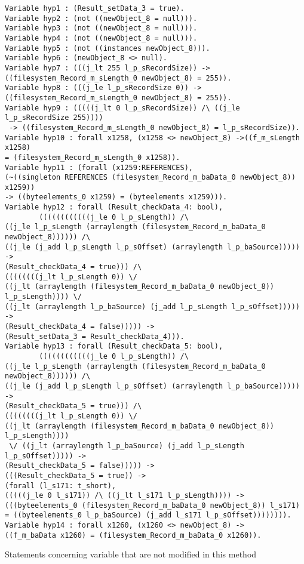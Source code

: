 \begin{lstlisting}
Variable hyp1 : (Result_setData_3 = true).
Variable hyp2 : (not ((newObject_8 = null))).
Variable hyp3 : (not ((newObject_8 = null))).
Variable hyp4 : (not ((newObject_8 = null))).
Variable hyp5 : (not ((instances newObject_8))).
Variable hyp6 : (newObject_8 <> null).
Variable hyp7 : (((j_lt 255 l_p_sRecordSize)) ->
((filesystem_Record_m_sLength_0 newObject_8) = 255)).
Variable hyp8 : (((j_le l_p_sRecordSize 0)) ->
((filesystem_Record_m_sLength_0 newObject_8) = 255)).
Variable hyp9 : (((((j_lt 0 l_p_sRecordSize)) /\ ((j_le l_p_sRecordSize 255))))
 -> ((filesystem_Record_m_sLength_0 newObject_8) = l_p_sRecordSize)).
Variable hyp10 : forall x1258, (x1258 <> newObject_8) ->((f_m_sLength x1258) 
= (filesystem_Record_m_sLength_0 x1258)).
Variable hyp11 : (forall (x1259:REFERENCES), 
(~((singleton REFERENCES (filesystem_Record_m_baData_0 newObject_8)) x1259)) 
-> ((byteelements_0 x1259) = (byteelements x1259))).
Variable hyp12 : forall (Result_checkData_4: bool),
        ((((((((((((j_le 0 l_p_sLength)) /\ 
((j_le l_p_sLength (arraylength (filesystem_Record_m_baData_0 newObject_8)))))) /\ 
((j_le (j_add l_p_sLength l_p_sOffset) (arraylength l_p_baSource))))) ->
(Result_checkData_4 = true))) /\ 
((((((((j_lt l_p_sLength 0)) \/ 
((j_lt (arraylength (filesystem_Record_m_baData_0 newObject_8)) l_p_sLength)))) \/ 
((j_lt (arraylength l_p_baSource) (j_add l_p_sLength l_p_sOffset))))) ->
(Result_checkData_4 = false))))) ->
(Result_setData_3 = Result_checkData_4))).
Variable hyp13 : forall (Result_checkData_5: bool),
        ((((((((((((j_le 0 l_p_sLength)) /\ 
((j_le l_p_sLength (arraylength (filesystem_Record_m_baData_0 newObject_8)))))) /\ 
((j_le (j_add l_p_sLength l_p_sOffset) (arraylength l_p_baSource))))) ->
(Result_checkData_5 = true))) /\ 
((((((((j_lt l_p_sLength 0)) \/ 
((j_lt (arraylength (filesystem_Record_m_baData_0 newObject_8)) l_p_sLength))))
 \/ ((j_lt (arraylength l_p_baSource) (j_add l_p_sLength l_p_sOffset))))) ->
(Result_checkData_5 = false))))) ->
(((Result_checkData_5 = true)) ->
(forall (l_s171: t_short), 
(((((j_le 0 l_s171)) /\ ((j_lt l_s171 l_p_sLength)))) ->
(((byteelements_0 (filesystem_Record_m_baData_0 newObject_8)) l_s171) 
= ((byteelements_0 l_p_baSource) (j_add l_s171 l_p_sOffset)))))))).
Variable hyp14 : forall x1260, (x1260 <> newObject_8) ->
((f_m_baData x1260) = (filesystem_Record_m_baData_0 x1260)).
\end{lstlisting}
Statements concerning variable that are not modified in this method
